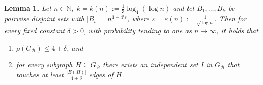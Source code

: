 \documentclass[a4paper,10pt]{amsart}
\newtheorem{lemma}[theorem]{Lemma}
\begin{document}
\begin{lemma}\label{lem:small}
Let $n\in \mathbb{N}$,  $k=k(n):=\frac{1}{3}\log_4(\log n)$ and let $B_1,\ldots,B_k$ be pairwise disjoint sets with $|B_i|=n^{1-4^i\varepsilon}$, where $\varepsilon=\varepsilon(n):=\frac{1}{\sqrt{\log n}}$. Then for every fixed constant $\delta>0$, with probability tending to one as $n\rightarrow \infty$, it holds that 
\begin{enumerate}
    \item[(a)] $\rho(G_{\mathcal{B}})\le 4+\delta$, and
    \item[(b)] for every subgraph $H\subseteq G_{\mathcal{B}}$ there exists an independent set $I$ in $G_{\mathcal{B}}$ that touches at least $\frac{|E(H)|}{4+\delta}$ edges of $H$. 
\end{enumerate}
\end{lemma}
\end{document}
